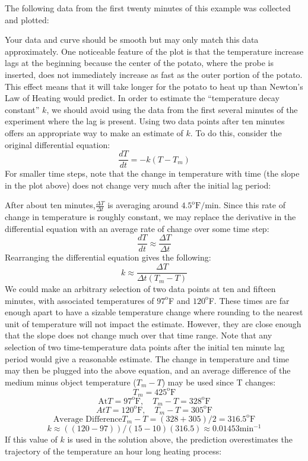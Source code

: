 \documentclass{ximera}
\begin{document}
The following data from the first twenty minutes of this example was collected and plotted:
  
Your data and curve should be smooth but may only match this data approximately.  One noticeable feature of the plot is that the temperature increase lags at the beginning because the center of the potato, where the probe is inserted, does not immediately increase as fast as the outer portion of the potato.  This effect means that it will take longer for the potato to heat up than Newton's Law of Heating would predict.  In order to estimate the ``temperature decay constant'' $k$, we should avoid using the data from the first several minutes of the experiment where the lag is present.  Using two data points after ten minutes offers an appropriate way to make an estimate of $k$.  To do this, consider the original differential equation:
\[
\frac{dT}{dt}=-k(T-T_m)
\]
For smaller time steps, note that the change in temperature with time (the slope in the plot above) does not change very much after the initial lag period:
 

After about ten minutes,$\frac{\Delta T}{\Delta t}$ is averaging around $4.5^{\text{o}}\text{F}/\text{min}$.  Since this rate of change in temperature is roughly constant, we may replace the derivative in the differential equation with an average rate of change over some time step:
\[
\frac{dT}{dt}\approx \frac{\Delta T}{\Delta t}
\]
Rearranging the differential equation gives the following:
\[
k\approx \frac{\Delta T}{\Delta t(T_m-T)}
\]
We could make an arbitrary selection of two data points at ten and fifteen minutes, with associated temperatures of $97^{\text{o}}$F and $120^{\text{o}}$F.  These times are far enough apart to have a sizable temperature change where rounding to the nearest unit of temperature will not impact the estimate.  However, they are close enough that the slope does not change much over that time range.  Note that any selection of two time-temperature data points after the initial ten minute lag period would give a reasonable estimate.  The change in temperature and time may then be plugged into the above equation, and an average difference of the medium minus object temperature
($T_m-T$) may be used since T changes:
\[
T_m=425^{\text{o}}\text{F}
\]
\[
\text{At} T=97^{\text{o}}\text{F},\quad T_m-T=328^{\text{o}}\text{F}
\]
\[
At T=120^{\text{o}}\text{F},\quad T_m-T=305^{\text{o}}\text{F}
\]
\[
\text{Average Difference} T_m-T= (328+305)/2=316.5^{\text{o}}\text{F} 
\]
\[
k\approx ((120-97))/(15-10)(316.5) \approx 0.01453 \text{min}^{-1}
\]
If this value of $k$ is used in the solution above, the prediction overestimates the trajectory of the temperature an hour long heating process:
 
\end{document}
